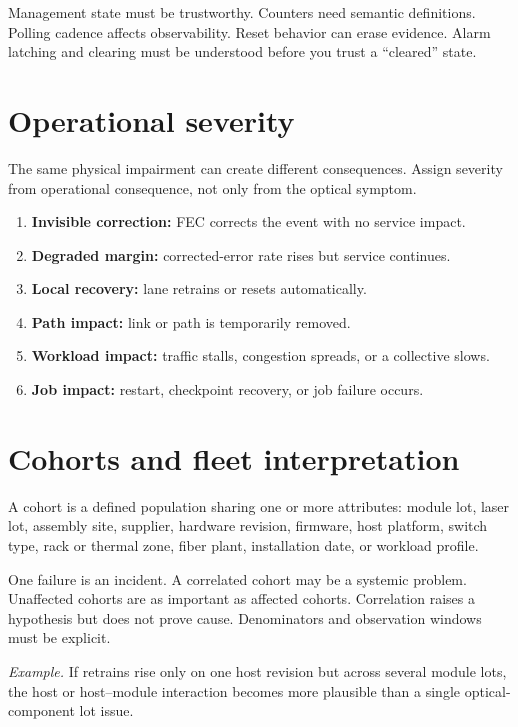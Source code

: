 Management state must be trustworthy. Counters need semantic definitions.
Polling cadence affects observability. Reset behavior can erase evidence. Alarm
latching and clearing must be understood before you trust a ``cleared'' state.

\section{Operational severity}
\label{sec:ops-severity}

The same physical impairment can create different consequences. Assign severity
from operational consequence, not only from the optical symptom.

\begin{enumerate}
\item \textbf{Invisible correction:} FEC corrects the event with no service
      impact.
\item \textbf{Degraded margin:} corrected-error rate rises but service
      continues.
\item \textbf{Local recovery:} lane retrains or resets automatically.
\item \textbf{Path impact:} link or path is temporarily removed.
\item \textbf{Workload impact:} traffic stalls, congestion spreads, or a
      collective slows.
\item \textbf{Job impact:} restart, checkpoint recovery, or job failure
      occurs.
\end{enumerate}

\section{Cohorts and fleet interpretation}
\label{sec:ops-cohorts}

A cohort is a defined population sharing one or more
attributes: module lot, laser lot, assembly site, supplier, hardware revision,
firmware, host platform, switch type, rack or thermal zone, fiber plant,
installation date, or workload profile.

One failure is an incident. A correlated cohort may be a systemic problem.
Unaffected cohorts are as important as affected cohorts. Correlation raises a
hypothesis but does not prove cause. Denominators and observation windows must
be explicit.

\textit{Example.} If retrains rise only on one host revision but across several
module lots, the host or host--module interaction becomes more plausible than a
single optical-component lot issue.

